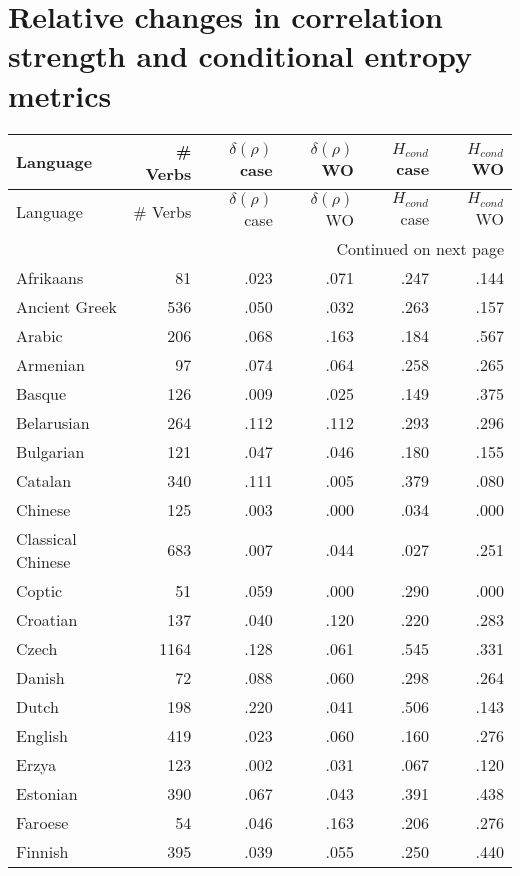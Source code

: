 \section{Relative changes in correlation strength and conditional entropy metrics}\label{appendix:exp3-conditional}
\begin{longtable}{lrrrrr}
    \toprule
    Language &  \# Verbs & $\delta(\rho)$ case & $\delta(\rho)$ WO & $H_{cond}$ case & $H_{cond}$ WO \\
    \midrule
    \endfirsthead
    \toprule
    Language &  \# Verbs & $\delta(\rho)$ case & $\delta(\rho)$ WO & $H_{cond}$ case & $H_{cond}$ WO \\
    \midrule
    \endhead
    \midrule
    \multicolumn{6}{r}{Continued on next page} \\
    \midrule
    \endfoot
    \bottomrule
    \endlastfoot
    Afrikaans & 81 & .023 & .071 & .247 & .144 \\
    Ancient Greek & 536 & .050 & .032 & .263 & .157 \\
    Arabic & 206 & .068 & .163 & .184 & .567 \\
    Armenian & 97 & .074 & .064 & .258 & .265 \\
    Basque & 126 & .009 & .025 & .149 & .375 \\
    Belarusian & 264 & .112 & .112 & .293 & .296 \\
    Bulgarian & 121 & .047 & .046 & .180 & .155 \\
    Catalan & 340 & .111 & .005 & .379 & .080 \\
    Chinese & 125 & .003 & .000 & .034 & .000 \\
    Classical Chinese & 683 & .007 & .044 & .027 & .251 \\
    Coptic & 51 & .059 & .000 & .290 & .000 \\
    Croatian & 137 & .040 & .120 & .220 & .283 \\
    Czech & 1164 & .128 & .061 & .545 & .331 \\
    Danish & 72 & .088 & .060 & .298 & .264 \\
    Dutch & 198 & .220 & .041 & .506 & .143 \\
    English & 419 & .023 & .060 & .160 & .276 \\
    Erzya & 123 & .002 & .031 & .067 & .120 \\
    Estonian & 390 & .067 & .043 & .391 & .438 \\
    Faroese & 54 & .046 & .163 & .206 & .276 \\
    Finnish & 395 & .039 & .055 & .250 & .440 \\

\end{longtable}
